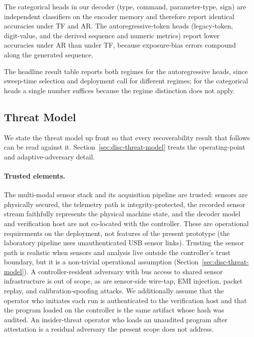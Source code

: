 \documentclass[sensors,article,submit,moreauthors,pdftex]{Definitions/mdpi}
\begin{document}
The categorical heads in our decoder (type, command, parameter-type, sign) are independent classifiers on the encoder memory and therefore report identical accuracies under TF and AR. The autoregressive-token heads (legacy-token, digit-value, and the derived sequence and numeric metrics) report lower accuracies under AR than under TF, because exposure-bias errors compound along the generated sequence.

The headline result table reports both regimes for the autoregressive heads, since sweep-time selection and deployment call for different regimes; for the categorical heads a single number suffices because the regime distinction does not apply.

\subsection{Threat Model}
\label{sec:problem-threat-model}

We state the threat model up front so that every recoverability result that follows can be read against it. Section~\ref{sec:disc-threat-model} treats the operating-point and adaptive-adversary detail.

\paragraph{Trusted elements.} The multi-modal sensor stack and its acquisition pipeline are trusted: sensors are physically secured, the telemetry path is integrity-protected, the recorded sensor stream faithfully represents the physical machine state, and the decoder model and verification host are not co-located with the controller. These are operational requirements on the deployment, not features of the present prototype (the laboratory pipeline uses unauthenticated USB sensor links). Trusting the sensor path is realistic when sensors and analysis live outside the controller's trust boundary, but it is a non-trivial operational assumption (Section~\ref{sec:disc-threat-model}). A controller-resident adversary with bus access to shared sensor infrastructure is out of scope, as are sensor-side wire-tap, EMI injection, packet replay, and calibration-spoofing attacks. We additionally assume that the operator who initiates each run is authenticated to the verification host and that the program loaded on the controller is the same artifact whose hash was audited. An insider-threat operator who loads an unaudited program after attestation is a residual adversary the present scope does not address.
\end{document}
